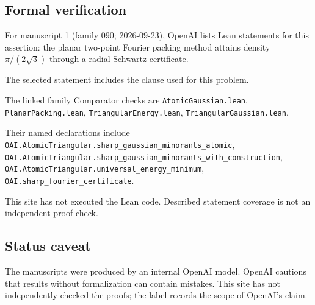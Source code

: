 \documentclass[11pt]{article}
\begin{document}
\subsection{Formal verification}
For manuscript 1 (family 090; 2026-09-23), OpenAI lists Lean statements for this assertion: the planar two-point Fourier packing method attains density $\pi/(2\sqrt3)$ through a radial Schwartz certificate.

The selected statement includes the clause used for this problem.

The linked family Comparator checks are \texttt{AtomicGaussian.lean}, \texttt{PlanarPacking.lean}, \texttt{TriangularEnergy.lean}, \texttt{TriangularGaussian.lean}.

Their named declarations include \texttt{OAI.AtomicTriangular.sharp\_gaussian\_minorants\_atomic}, \texttt{OAI.AtomicTriangular.sharp\_gaussian\_minorants\_with\_construction}, \texttt{OAI.AtomicTriangular.universal\_energy\_minimum}, \texttt{OAI.sharp\_fourier\_certificate}.

This site has not executed the Lean code. Described statement coverage is not an independent proof check.

\subsection{Status caveat}
The manuscripts were produced by an internal OpenAI model. OpenAI cautions that results without formalization can contain mistakes. This site has not independently checked the proofs; the label records the scope of OpenAI's claim.
\end{document}

